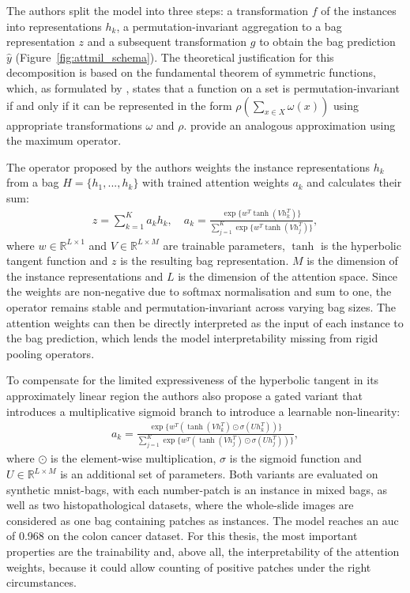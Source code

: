 \documentclass[12pt,parskip = half, DIV=classic,listof=totoc]{scrartcl}
\begin{document}
			The authors split the model into three steps: a transformation $f$ of the instances into representations $h_k$, 
			a permutation-invariant aggregation to a bag representation $z$  and a subsequent transformation $g$ to obtain 
			the bag prediction $\hat{y}$ (Figure~\ref{fig:attmil_schema}). The theoretical justification for this decomposition is based on the fundamental theorem of 
			symmetric functions, which, as formulated by \textcite{zaheerDeepSets2018}, states that a function on a set is 
			permutation-invariant if and only if it can be represented in the form $\rho(\sum_{x\in X}\omega(x))$ using 
			appropriate transformations $\omega$ and $\rho$. \textcite{qiPointNetDeepLearning2017} provide an analogous 
			approximation using the maximum operator.

			The operator proposed by the authors weights the instance representations $h_k$ from a bag $H=\{h_1,...,h_k\}$ with trained attention weights
			$a_k$ and calculates their sum:
			\begin{align*}
				z = \sum^K_{k=1}a_kh_k, \quad a_k = \frac{\exp\{w^T\tanh(Vh_k^T)\}}{\sum_{j=1}^K\exp\{w^T\tanh(Vh_j^T)\}},
			\end{align*}
			where $w \in \mathbb{R}^{L\times1}$ and $V\in \mathbb{R}^{L\times M}$ are trainable parameters, $\tanh$ is the hyperbolic tangent function and $z$ is the resulting 
			bag representation. $M$ is the dimension of the instance representations and $L$ is the dimension of the attention space. Since the weights are non-negative due to softmax normalisation and 
			sum to one, the operator remains stable and permutation-invariant across varying bag sizes. 
			The attention weights can then be directly interpreted as the input of each instance to the bag prediction,
			which lends the model interpretability missing from rigid pooling operators.

			To compensate for the limited expressiveness of the hyperbolic tangent in its approximately linear region 
			the authors also propose a gated variant that introduces a multiplicative sigmoid branch to introduce a learnable non-linearity:
			\begin{align*}
				a_k = \frac{\exp\{w^T(\tanh(Vh_k^T)\odot \sigma(Uh_k^T))\}}{\sum_{j=1}^K \exp\{w^T(\tanh(Vh_j^T)\odot \sigma(Uh_j^T))\}},
			\end{align*}
			where $\odot$ is the element-wise multiplication, $\sigma$ is the sigmoid function and $U \in \mathbb{R}^{L\times M}$ is an additional set of parameters. Both variants 
			are evaluated on synthetic \acs*{mnist}-bags, with each number-patch is an instance in mixed bags, as well as two 
			histopathological datasets, where the whole-slide images are considered as one bag containing patches as instances.
			The model reaches an \ac{auc} of 0.968 on the colon cancer dataset. For this thesis, the most important properties are the trainability 
			and, above all, the interpretability of the attention weights, because it could allow counting of positive patches under the
			right circumstances.
\end{document}

